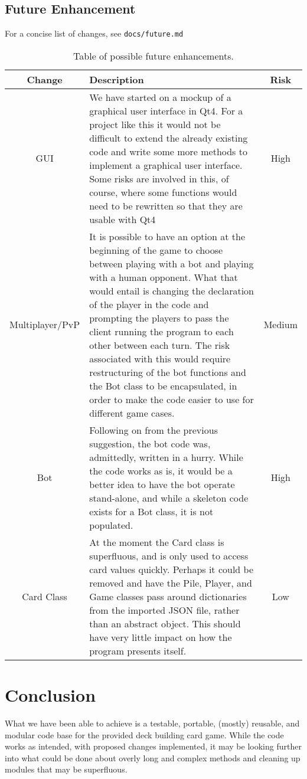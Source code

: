 \documentclass[12pt,a4paper,tightenlines]{article}
\begin{document}
\newpage
\subsection{Future Enhancement}
For a concise list of changes, see \texttt{docs/future.md}
\begin{table}[!ht]
    \begin{tabular}{|c|m{10cm}|c|}
        \hline
        Change & Description & Risk\\
        \hline
        GUI & We have started on a mockup of a graphical user interface
        in Qt4. For a project like this it would not be difficult
        to extend the already existing code and write some more
        methods to implement a graphical user interface. Some risks are 
        involved in this, of course, where some functions would need to be
        rewritten so that they are usable with Qt4 & 
        \cellcolor{red!50}High \\
        \hline
        Multiplayer/PvP & It is possible to have an option at the 
        beginning of the game to choose between playing with a bot
        and playing with a human opponent. What that would entail
        is changing the declaration of the player in the code and
        prompting the players to pass the client running the program
        to each other between each turn. The risk associated with this
        would require restructuring of the bot functions and the 
        Bot class to be encapsulated, in order to make the code easier
        to use for different game cases. & \cellcolor{yellow!50} Medium\\
        \hline
        Bot & Following on from the previous suggestion, the bot code was,
        admittedly, written in a hurry. While the code works as is, 
        it would be a better idea to have the bot operate 
        stand-alone, and while a skeleton code exists for a Bot
        class, it is not populated. & \cellcolor{red!50} High\\
        \hline
        Card Class & At the moment the Card class is superfluous, and
        is only used to access card values quickly. Perhaps it could
        be removed and have the Pile, Player, and Game classes pass around
        dictionaries from the imported JSON file, rather than an abstract 
        object. This should have very little impact on how the program
        presents itself.& \cellcolor{green!50} Low\\
    \end{tabular}
    \caption{Table of possible future enhancements.}
\end{table}

\section{Conclusion}
What we have been able to achieve is a testable, portable, (mostly) reusable,
and modular code base for the provided deck building card game. While the
code works as intended, with proposed changes implemented, it may be looking
further into what could be done about overly long and complex methods
and cleaning up modules that may be superfluous.

%
\end{document}
